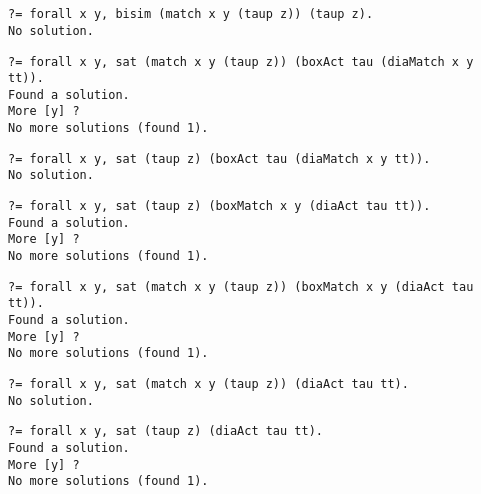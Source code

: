 \documentclass{article}
\newcommand{\ttt}{\mathtt{t\hspace*{-.25em}t}}
\newcommand{\boxm}[1]{\mathopen{\big[ #1 \big]}} %
\newcommand{\diam}[1]{\mathopen{\big\langle #1 \big\rangle}}
\begin{document}
\section{}
\fbox{$[x=y]\tau \not \sim \tau$}
{\small%
\begin{verbatim}
?= forall x y, bisim (match x y (taup z)) (taup z).
No solution.
\end{verbatim}}
%
\fbox{$[x=y]\tau \models \boxm{\tau}\diam{x=y}\ttt$}
{\small%
\begin{verbatim}
?= forall x y, sat (match x y (taup z)) (boxAct tau (diaMatch x y tt)).
Found a solution.
More [y] ? 
No more solutions (found 1).
\end{verbatim}}
%
\fbox{$\tau \not\models \boxm{\tau}\diam{x=y}\ttt$}
{\small%
\begin{verbatim}
?= forall x y, sat (taup z) (boxAct tau (diaMatch x y tt)).
No solution.
\end{verbatim}}
%
\fbox{$\tau \models \boxm{x=y}\diam{\tau}\ttt$}
{\small%
\begin{verbatim}
?= forall x y, sat (taup z) (boxMatch x y (diaAct tau tt)).
Found a solution.
More [y] ? 
No more solutions (found 1).
\end{verbatim}}
%
\fbox{$[x=y]\tau \models \boxm{x=y}\diam{\tau}\ttt$}
{\small%
\begin{verbatim}
?= forall x y, sat (match x y (taup z)) (boxMatch x y (diaAct tau tt)).
Found a solution.
More [y] ? 
No more solutions (found 1).
\end{verbatim}}
%
\fbox{$[x=y]\tau \not\models \diam{\tau}\ttt$}
{\small%
\begin{verbatim}
?= forall x y, sat (match x y (taup z)) (diaAct tau tt).
No solution.
\end{verbatim}}
%
\fbox{$\tau \models \diam{\tau}\ttt$}
{\small%
\begin{verbatim}
?= forall x y, sat (taup z) (diaAct tau tt).
Found a solution.
More [y] ? 
No more solutions (found 1).
\end{verbatim}}


\newpage
\end{document}
